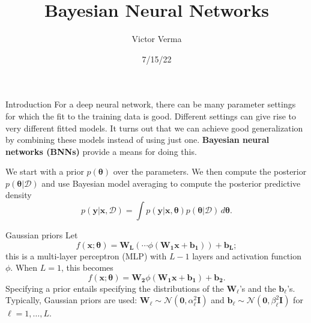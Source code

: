 \documentclass{beamer}
\title[Bayesian Neural Networks]{
Bayesian Neural Networks
}
\author[Victor Verma]{Victor Verma}
\institute[]{Hot Ideas in Machine Learning Reading Group, University of Michigan}
\date{7/15/22}
\begin{document}
\begin{frame}
  \titlepage
\end{frame}



\begin{frame}{Introduction}
    For a deep neural network, there can be many parameter settings for which the fit to the training data is good. Different settings can give rise to very different fitted models. It turns out that we can achieve good generalization by combining these models instead of using just one. \textbf{Bayesian neural networks (BNNs)} provide a means for doing this.
    
    \medskip
    
    We start with a prior $p(\boldsymbol{\theta})$ over the parameters. We then compute the posterior $p(\boldsymbol{\theta} | \mathcal{D})$ and use Bayesian model averaging to compute the posterior predictive density
    \begin{equation*}
        p(\boldsymbol{y} | \boldsymbol{x}, \mathcal{D}) = \int p(\boldsymbol{y} | \boldsymbol{x}, \boldsymbol{\theta})p(\boldsymbol{\theta} | \mathcal{D})\,d\boldsymbol{\theta}.
    \end{equation*}
\end{frame}

\begin{frame}{Gaussian priors}
    Let
    \[
    f(\boldsymbol{x}; \boldsymbol{\theta}) = \boldsymbol{W_L}(\cdots\phi(\boldsymbol{W_1}\boldsymbol{x} + \boldsymbol{b_1})) + \boldsymbol{b_L};
    \]
    this is a multi-layer perceptron (MLP) with $L - 1$ layers and activation function $\phi$. When $L = 1$, this becomes
    \[
    f(\boldsymbol{x}; \boldsymbol{\theta}) = \boldsymbol{W_2}\phi(\boldsymbol{W_1}\boldsymbol{x} + \boldsymbol{b_1}) + \boldsymbol{b_2}.
    \]
    Specifying a prior entails specifying the distributions of the $\boldsymbol{W}_{\ell}$'s and the $\boldsymbol{b}_{\ell}$'s. Typically, Gaussian priors are used: $\boldsymbol{W}_{\ell} \sim \mathcal{N}(\boldsymbol{0}, \alpha_{\ell}^2\boldsymbol{I})$ and $\boldsymbol{b}_{\ell} \sim \mathcal{N}(\boldsymbol{0}, \beta_{\ell}^2\boldsymbol{I})$ for $\ell = 1, \ldots, L$.
\end{frame}
\end{document}
